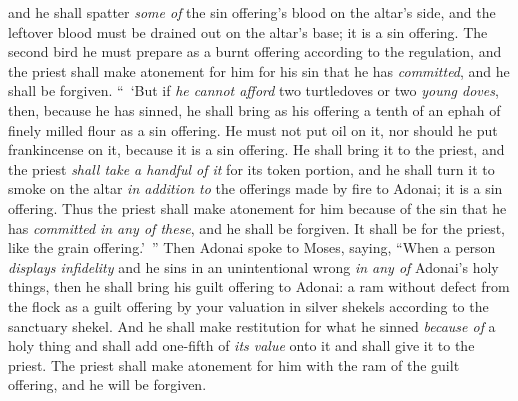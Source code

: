 \begin{biblechapter}
\verse and he shall spatter \textit{some of} the sin offering’s blood on the altar’s side, and the leftover blood must be drained out on the altar’s base; it is a sin offering.
\verse The second bird he must prepare as a burnt offering according to the regulation, and the priest shall make atonement for him for his sin that he has \textit{committed}, and he shall be forgiven.
\verse “ ‘But if \textit{he cannot afford} two turtledoves or two \textit{young doves}, then, because he has sinned, he shall bring as his offering a tenth of an ephah of finely milled flour as a sin offering. He must not put oil on it, nor should he put frankincense on it, because it is a sin offering.
\verse He shall bring it to the priest, and the priest \textit{shall take a handful of it} for its token portion, and he shall turn it to smoke on the altar \textit{in addition to} the offerings made by fire to Adonai; it is a sin offering.
\verse Thus the priest shall make atonement for him because of the sin that he has \textit{committed} \textit{in any of these}, and he shall be forgiven. It shall be for the priest, like the grain offering.’ ”
 Then Adonai spoke to Moses, saying,
\verse “When a person \textit{displays infidelity} and he sins in an unintentional wrong \textit{in any of} Adonai’s holy things, then he shall bring his guilt offering to Adonai: a ram without defect from the flock as a guilt offering by your valuation in silver shekels according to the sanctuary shekel.
\verse And he shall make restitution for what he sinned \textit{because of} a holy thing and shall add one-fifth of \textit{its value} onto it and shall give it to the priest. The priest shall make atonement for him with the ram of the guilt offering, and he will be forgiven.

\end{biblechapter}
